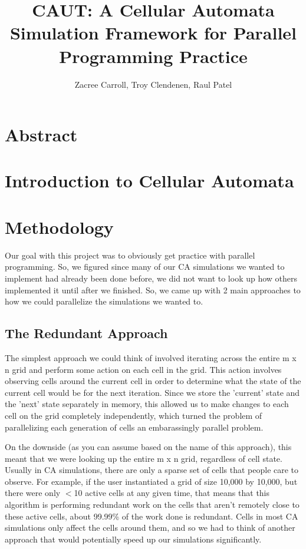 \documentclass[12pt]{article}
\begin{document}
\title{CAUT: A Cellular Automata Simulation Framework for Parallel Programming Practice}
\author{Zacree Carroll, Troy Clendenen, Raul Patel}
\maketitle

\section{Abstract}

\section{Introduction to Cellular Automata}

\section{Methodology}
Our goal with this project was to obviously get practice with parallel programming. So, we figured since many of our CA simulations we wanted to implement had already been done before, we did not want to look up how others implemented it until after we finished. So, we came up with 2 main approaches to how we could parallelize the simulations we wanted to.

\subsection{The Redundant Approach}
The simplest approach we could think of involved iterating across the entire m x n grid and perform some action on each cell in the grid. This action involves observing cells around the current cell in order to determine what the state of the current cell would be for the next iteration. Since we store the 'current' state and the 'next' state separately in memory, this allowed us to make changes to each cell on the grid completely independently, which turned the problem of parallelizing each generation of cells an embarassingly parallel problem.

On the downside (as you can assume based on the name of this approach), this meant that we were looking up the entire m x n grid, regardless of cell state. Usually in CA simulations, there are only a sparse set of cells that people care to observe. For example, if the user instantiated a grid of size 10,000 by 10,000, but there were only $<$10 active cells at any given time, that means that this algorithm is performing redundant work on the cells that aren't remotely close to these active cells, about 99.99\% of the work done is redundant. Cells in most CA simulations only affect the cells around them, and so we had to think of another approach that would potentially speed up our simulations significantly.
\end{document}
